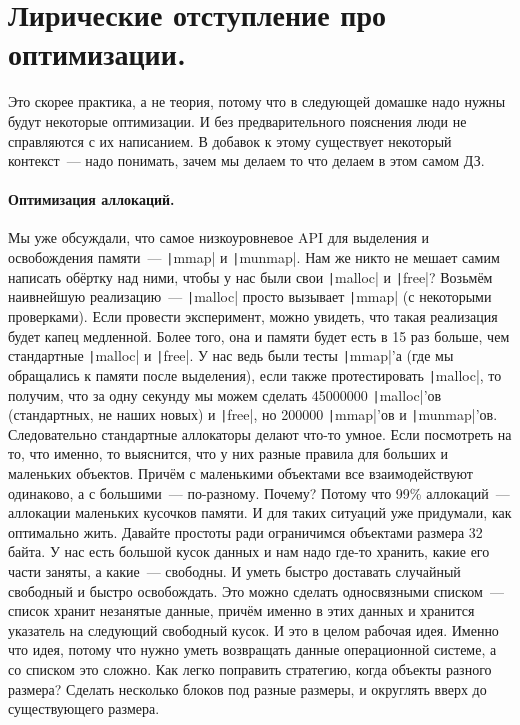 \documentclass{article}
\begin{document}
    \section{Лирические отступление про оптимизации.}
    Это скорее практика, а не теория, потому что в следующей домашке надо нужны будут некоторые оптимизации. И без предварительного пояснения люди не справляются с их написанием. В добавок к этому существует некоторый контекст~--- надо понимать, зачем мы делаем то что делаем в этом самом ДЗ.
    \paragraph{Оптимизация аллокаций.}
    Мы уже обсуждали, что самое низкоуровневое API для выделения и освобождения памяти~--- \texttt|mmap| и \texttt|munmap|. Нам же никто не мешает самим написать обёртку над ними, чтобы у нас были свои \texttt|malloc| и \texttt|free|? Возьмём наивнейшую реализацию~--- \texttt|malloc| просто вызывает \texttt|mmap| (с некоторыми проверками). Если провести эксперимент, можно увидеть, что такая реализация будет капец медленной. Более того, она и памяти будет есть в 15 раз больше, чем стандартные \texttt|malloc| и \texttt|free|. У нас ведь были тесты \texttt|mmap|'а (где мы обращались к памяти после выделения), если также протестировать \texttt|malloc|, то получим, что за одну секунду мы можем сделать 45000000 \texttt|malloc|'ов (стандартных, не наших новых) и \texttt|free|, но 200000 \texttt|mmap|'ов и \texttt|munmap|'ов.\\
    Следовательно стандартные аллокаторы делают что-то умное. Если посмотреть на то, что именно, то выяснится, что у них разные правила для больших и маленьких объектов. Причём с маленькими объектами все взаимодействуют одинаково, а с большими~--- по-разному. Почему? Потому что 99\% аллокаций~--- аллокации маленьких кусочков памяти. И для таких ситуаций уже придумали, как оптимально жить. Давайте простоты ради ограничимся объектами размера 32 байта. У нас есть большой кусок данных и нам надо где-то хранить, какие его части заняты, а какие~--- свободны. И уметь быстро доставать случайный свободный и быстро освобождать. Это можно сделать односвязными списком~--- список хранит незанятые данные, причём именно в этих данных и хранится указатель на следующий свободный кусок. И это в целом рабочая идея. Именно что идея, потому что нужно уметь возвращать данные операционной системе, а со списком это сложно. Как легко поправить стратегию, когда объекты разного размера? Сделать несколько блоков под разные размеры, и округлять вверх до существующего размера.
\end{document}
